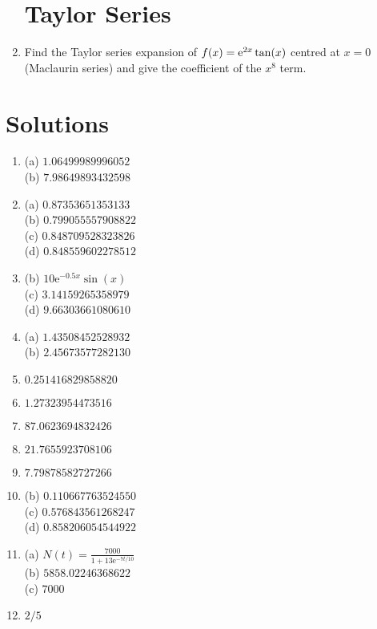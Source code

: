 \begin{enumerate}
\section*{Taylor Series}

\item Find the Taylor series expansion of $f(x) = {\rm e}^{2x} \tan(x)$ centred at $x=0$ (Maclaurin series) and give the coefficient of the $x^8$ term.

\end{enumerate}

\clearpage

\section*{Solutions}

\begin{enumerate}
    \item (a) $1.06499989996052$ \\(b) $7.98649893432598$
    \item (a) $0.87353651353133$ \\(b) $0.799055557908822$ \\(c) $0.848709528323826$ \\(d) $0.848559602278512$
    \item (b) $10 {\mathrm e}^{- 0.5 x} \sin\! \left(x\right)$ \\(c) $3.14159265358979$ \\(d) $9.66303661080610$
    \item (a) $1.43508452528932$ \\(b) $2.45673577282130$
    \item $0.251416829858820$
    \item $1.27323954473516$
    \item $87.0623694832426$
    \item $21.7655923708106$
    \item $7.79878582727266$
    \item (b) $0.110667763524550$ \\(c) $0.576843561268247$ \\(d) $0.858206054544922$
    \item (a) $N\! \left(t\right)=\frac{7000}{1+13 {\mathrm e}^{-7 t/10}}$ \\(b) $5858.02246368622$ \\(c) $7000$
    \item $2/5$
\end{enumerate}